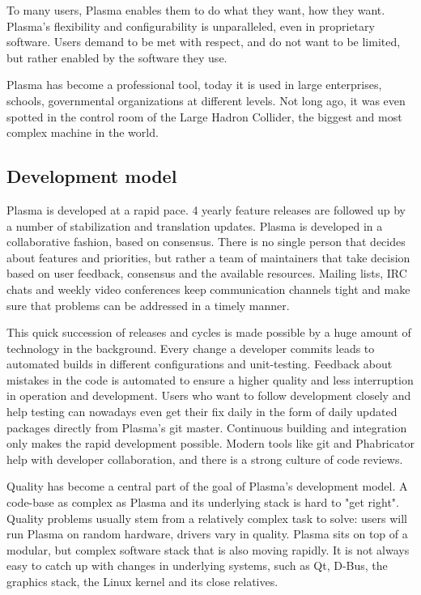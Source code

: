To many users, Plasma enables them to do what they want, how they want. Plasma's flexibility and configurability is unparalleled, even in proprietary software. Users demand to be met with respect, and do not want to be limited, but rather enabled by the software they use.

Plasma has become a professional tool, today it is used in large enterprises, schools, governmental organizations at different levels. Not long ago, it was even spotted in the control room of the Large Hadron Collider, the biggest and most complex machine in the world.

\subsection*{Development model}

Plasma is developed at a rapid pace. 4 yearly feature releases are followed up by a number of stabilization and translation updates.
Plasma is developed in a collaborative fashion, based on consensus. There is no single person that decides about features and priorities, but rather a team of maintainers that take decision based on user feedback, consensus and the available resources. Mailing lists, IRC chats and weekly video conferences keep communication channels tight and make sure that problems can be addressed in a timely manner.

This quick succession of releases and cycles is made possible by a huge amount of technology in the background. Every change a developer commits leads to automated builds in different configurations and unit-testing. Feedback about mistakes in the code is automated to ensure a higher quality and less interruption in operation and development. Users who want to follow development closely and help testing can nowadays even get their fix daily in the form of daily updated packages directly from Plasma's git master. Continuous building and integration only makes the rapid development possible.
Modern tools like git and Phabricator help with developer collaboration, and there is a strong culture of code reviews.

Quality has become a central part of the goal of Plasma's development model. A code-base as complex as Plasma and its underlying stack is hard to "get right". Quality problems usually stem from a relatively complex task to solve: users will run Plasma on random hardware, drivers vary in quality. Plasma sits on top of a modular, but complex software stack that is also moving rapidly. It is not always easy to catch up with changes in underlying systems, such as Qt, D-Bus, the graphics stack, the Linux kernel and its close relatives.

